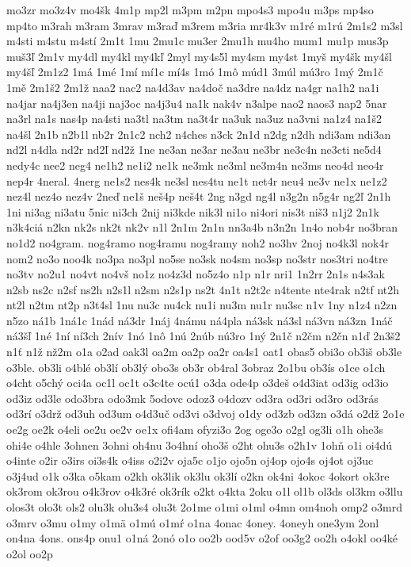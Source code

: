{mo3zr
mo3z4v
mo4šk
4m1p
mp2l
m3pm
m2pn
mpo4s3
mpo4u
m3ps
mp4so
mp4to
m3rah
m3ram
3mrav
m3raď
m3rem
m3ria
mr4k3v
m1ré
m1rú
2m1s2
m3sl
m4sti
m4stu
m4stí
2m1t
1mu
2mu1c
mu3er
2mu1h
mu4ho
mum1
mu1p
mus3p
muš3ľ
2m1v
my4dl
my4kl
my4kľ
2myl
my4s5l
my4sm
my4st
1myš
my4šk
my4šl
my4šľ
2m1z2
1má
1mé
1mí
mí1c
mí4s
1mó
1mô
múd1
3múl
mú3ro
1mý
2m1č
1mě
2m1š2
2m1ž
naa2
nac2
na4d3av
na4doč
na3dre
na4dz
na4gr
na1h2
na1i
na4jar
na4j3en
na4ji
naj3oc
na4j3u4
na1k
nak4v
n3alpe
nao2
naos3
nap2
5nar
na3rl
na1s
nas4p
na4sti
na3tl
na3tm
na3t4r
na3uk
na3uz
na3vni
na1z4
na1š2
na4šl
2n1b
n2b1l
nb2r
2n1c2
nch2
n4ches
n3ck
2n1d
n2dg
n2dh
ndi3am
ndi3an
nd2l
n4dla
nd2r
nd2ľ
nd2ž
1ne
ne3an
ne3ar
ne3au
ne3br
ne3c4n
ne3cti
ne5d4
nedy4c
nee2
neg4
ne1h2
ne1i2
ne1k
ne3mk
ne3ml
ne3m4n
ne3ms
neo4d
neo4r
nep4r
4neral.
4nerg
ne1s2
nes4k
ne3sl
nes4tu
ne1t
net4r
neu4
ne3v
ne1x
ne1z2
nez4l
nez4o
nez4v
2neď
ne1š
neš4p
neš4t
2ng
n3gd
ng4l
n3g2n
n5g4r
ng2ľ
2n1h
1ni
ni3ag
ni3atu
5nic
ni3ch
2nij
ni3kde
nik3l
ni1o
ni4ori
nis3t
niš3
n1j2
2n1k
n3k4ciá
n2kn
nk2s
nk2t
nk2v
n1l
2n1m
2n1n
nn3a4b
n3n2n
1n4o
nob4r
no3bran
no1d2
no4gram.
nog4ramo
nog4ramu
nog4ramy
noh2
no3hv
2noj
no4k3l
nok4r
nom2
no3o
noo4k
no3pa
no3pl
no5se
no3sk
no4sm
no3sp
no3str
nos3tri
no4tre
no3tv
no2u1
no4vt
no4vš
no1z
no4z3d
no5z4o
n1p
n1r
nri1
1n2rr
2n1s
n4s3ak
n2sb
ns2c
n2sf
ns2h
n2s1l
n2sm
n2s1p
ns2t
4n1t
n2t2c
n4tente
nte4rak
n2tf
nt2h
nt2l
n2tm
nt2p
n3t4sl
1nu
nu3c
nu4ck
nu1i
nu3m
nu1r
nu3sc
n1v
1ny
n1z4
n2zn
n5zo
ná1b
1ná1c
1nád
ná3dr
1náj
4námu
ná4pla
ná3sk
ná3sl
ná3vn
ná3zn
1náč
ná3šľ
1né
1ní
ní3ch
2nív
1nó
1nô
1nú
2núb
nú3ro
1ný
2n1č
n2čm
n2čn
n1ď
2n3š2
n1ť
n1ž
nž2m
o1a
o2ad
oak3l
oa2m
oa2p
oa2r
oa4s1
oat1
obas5
obi3o
ob3iš
ob3le
o3ble.
ob3li
o4blé
ob3lí
ob3lý
obo3s
ob3r
ob4ral
3obraz
2o1bu
ob3ís
o1ce
o1ch
o4cht
o5chý
oci4a
oc1l
oc1t
o3c4te
ocú1
o3da
ode4p
o3deš
o4d3iat
od3ig
od3io
od3iz
od3le
odo3bra
odo3mk
5odovc
odoz3
o4dozv
od3ra
od3ri
od3ro
od3rás
od3rí
o3drž
od3uh
od3um
o4d3uč
od3vi
o3dvoj
o1dy
od3zb
od3zn
o3dá
o2dž
2o1e
oe2g
oe2k
o4eli
oe2u
oe2v
oe1x
ofi4am
ofyzi3o
2og
oge3o
o2gl
og3li
o1h
ohe3s
ohi4e
o4hle
3ohnen
3ohni
oh4nu
3o4hní
oho3š
o2ht
ohu3s
o2h1v
1ohň
o1i
oi4dú
o4inte
o2ir
o3irs
oi3s4k
o4iss
o2i2v
oja5c
o1jo
ojo5n
oj4op
ojo4s
oj4ot
oj3uc
o3j4ud
o1k
o3ka
o5kam
o2kh
ok3lik
ok3lu
ok3lí
o2kn
ok4ni
4okoc
4okort
ok3re
ok3rom
ok3rou
o4k3rov
o4k3ré
ok3rík
o2kt
o4kta
2oku
o1l
ol1b
ol3ds
ol3km
o3llu
olos3t
olo3t
ols2
olu3k
olu3s4
olu3t
2o1me
o1mi
o1ml
o4mn
om4noh
omp2
o3mrd
o3mrv
o3mu
o1my
o1mä
o1mú
o1mŕ
o1na
4onac
4oney.
4oneyh
one3ym
2onl
on4na
4ons.
ons4p
onu1
o1ná
2onó
o1o
oo2b
ood5v
o2of
oo3g2
oo2h
o4okl
oo4ké
o2ol
oo2p
}
